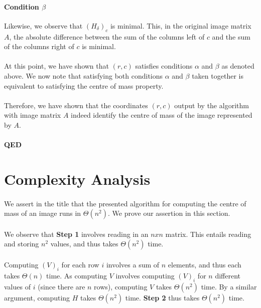 \documentclass[]{article}
\begin{document}
		\paragraph{Condition $\beta$}
		Likewise, we observe that $(H_\delta)_c$ is minimal. This, in the original image matrix $A$, the absolute difference between the sum of the columns left of $c$ and the sum of the columns right of $c$ is minimal.
		
		\paragraph{}
		At this point, we have shown that $(r,c)$ satisfies conditions $\alpha$ and $\beta$ as denoted above. We now note that satisfying both conditions $\alpha$ and $\beta$ taken together is equivalent to satisfying the centre of mass property.
		
		\paragraph{}
		Therefore, we have shown that the coordinates $(r,c)$ output by the algorithm with image matrix $A$ indeed identify the centre of mass of the image represented by $A$.
		
		\paragraph{QED}
	
	\section{Complexity Analysis}
		\paragraph{}
		We assert in the title that the presented algorithm for computing the centre of mass of an image runs in $\Theta(n^2)$. We prove our assertion in this section.
		
		\paragraph{}
		We observe that \textbf{Step 1} involves reading in an $n x n$ matrix. This entails reading and storing $n^2$ values, and thus takes $\Theta(n^2)$ time.
		
		\paragraph{}
		Computing $(V)_i$ for each row $i$ involves a sum of $n$ elements, and thus each takes $\Theta(n)$ time. As computing $V$ involves computing $(V)_i$ for $n$ different values of $i$ (since there are $n$ rows), computing $V$ takes $\Theta(n^2)$ time. By a similar argument, computing $H$ takes $\Theta(n^2)$ time. \textbf{Step 2} thus takes $\Theta(n^2)$ time.
		
\end{document}

